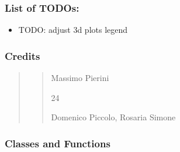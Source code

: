 \documentclass[letterpaper,10pt,english]{sphinxmanual}
\begin{document}
\subsubsection{List of TODOs:}
\label{\detokenize{cubmods:id18}}\begin{itemize}
\item {} 
\sphinxAtStartPar
TODO: adjust 3d plots legend

\end{itemize}


\subsubsection{Credits}
\label{\detokenize{cubmods:id19}}\begin{quote}
\begin{quote}\begin{description}
\sphinxAtStartPar
Massimo Pierini

\sphinxhyphen{}24

\sphinxAtStartPar
Domenico Piccolo, Rosaria Simone

\sphinxAtStartPar
{}

\end{description}\end{quote}
\end{quote}


\subsubsection{Classes and Functions}
\label{\detokenize{cubmods:id20}}
\end{document}

